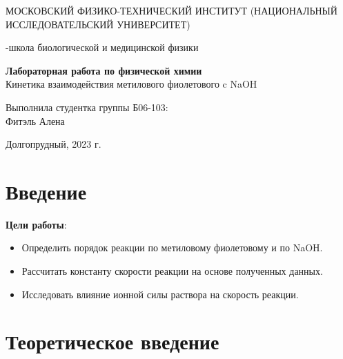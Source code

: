\documentclass[a4paper,12pt]{article}
\begin{document}
\def\figurename{Рисунок}
\begin{titlepage}
\begin{center}
    {\large МОСКОВСКИЙ ФИЗИКО-ТЕХНИЧЕСКИЙ ИНСТИТУТ (НАЦИОНАЛЬНЫЙ ИССЛЕДОВАТЕЛЬСКИЙ УНИВЕРСИТЕТ)}
\end{center}
\begin{center}
    {-школа биологической и медицинской физики}
\end{center}

\vspace{1cm}
{\huge
\begin{center}
    {\bf Лабораторная работа по физической химии}\\
    \vspace{0.5cm}
    Кинетика взаимодействия метилового фиолетового c NaOH
\end{center}
}

\vspace{4cm}
\begin{flushright}
{\LARGE Выполнила студентка группы Б06-103:\\ Фитэль Алена \\}

\end{flushright}
\vspace{9cm}
\begin{center}
    Долгопрудный, 2023 г.
\end{center}
\end{titlepage}
\newpage
\newpage
\section{Введение}
\setcounter{page}{2}
\textbf{Цели работы}: 
\begin{itemize}
\item Определить порядок реакции по метиловому фиолетовому и по NaOH.
\item Рассчитать константу скорости реакции на основе полученных данных.
\item Исследовать влияние ионной силы раствора на скорость реакции.
\end{itemize}

\section{Теоретическое введение \cite{2}}
\end{document}
